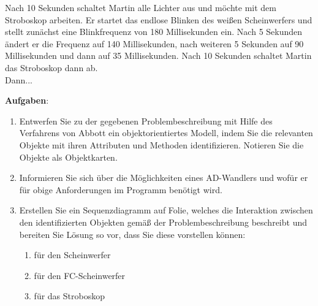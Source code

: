 \documentclass[11pt, a4paper]{article}
\begin{document}
\begin{mdframed}
Nach 10 Sekunden schaltet Martin alle Lichter aus und möchte mit dem Stroboskop arbeiten. Er startet das endlose Blinken des weißen Scheinwerfers und stellt zunächst eine Blinkfrequenz von 180 Millisekunden ein. Nach 5 Sekunden ändert er die Frequenz auf 140 Millisekunden, nach weiteren 5 Sekunden auf 90 Millisekunden und dann auf 35 Millisekunden. Nach 10 Sekunden schaltet Martin das Stroboskop dann ab.\\

Dann...\\

\end{mdframed}

\newpage
\textbf{Aufgaben}:
\begin{enumerate}
\item Entwerfen Sie zu der gegebenen Problembeschreibung mit Hilfe des Verfahrens von Abbott ein objektorientiertes Modell, indem Sie die relevanten Objekte mit ihren Attributen und Methoden identifizieren. Notieren Sie die Objekte als Objektkarten.


\item Informieren Sie sich über die Möglichkeiten eines AD-Wandlers und wofür er für obige Anforderungen im Programm benötigt wird.

\item Erstellen Sie ein Sequenzdiagramm auf Folie, welches die Interaktion zwischen den identifizierten Objekten gemäß der Problembeschreibung beschreibt und bereiten Sie Lösung so vor, dass Sie diese vorstellen können:
\begin{enumerate}
	\item für den Scheinwerfer
	\item für den FC-Scheinwerfer
	\item für das Stroboskop
\end{enumerate}
\end{enumerate}
\end{document}
